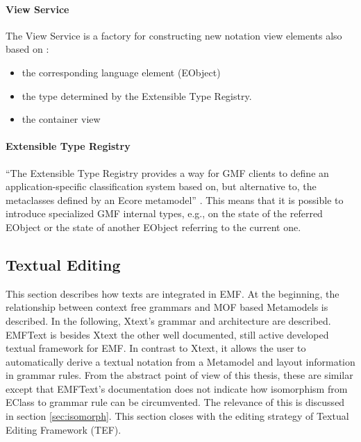 \paragraph{View Service}
The View Service is a factory for constructing new notation view elements also based on \cite{GMFDoc}:
\begin{itemize}
	\item the corresponding language element (EObject)
	\item the type determined by the Extensible Type Registry.
	\item the container view  
\end{itemize}

\paragraph{Extensible Type Registry}
``The Extensible Type Registry provides a way for GMF clients to define an application-specific classification system based on, but alternative to, the metaclasses defined by an Ecore metamodel'' \cite{GMFDoc}. This means that it is possible to introduce specialized GMF internal types, e.g., on the state of the referred EObject or the state of another EObject referring to the current one.










 

\subsection{Textual Editing}
This section describes how texts are integrated in EMF. At the beginning, the relationship between context free grammars and MOF based Metamodels is described. In the following, Xtext's \cite{XTextMan} grammar and architecture are described. EMFText \cite{EMFTextMan} is besides Xtext the other well documented, still active developed textual framework for EMF. In contrast to Xtext, it allows the user to automatically derive a textual notation from a Metamodel and layout information in grammar rules. From the abstract point of view of this thesis, these are similar except that EMFText's documentation does not indicate how isomorphism from EClass to grammar rule can be circumvented. The relevance of this is discussed in section \ref{sec:isomorph}. This section closes with the editing strategy of Textual Editing Framework (TEF).


